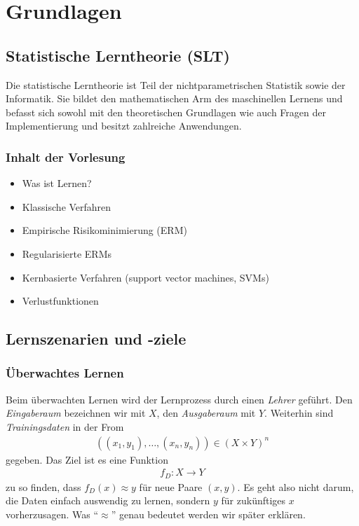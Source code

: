 \chapter{Grundlagen}

\section{Statistische Lerntheorie (SLT)}

Die statistische Lerntheorie ist Teil der nichtparametrischen Statistik sowie
der Informatik. Sie bildet den mathematischen Arm des maschinellen
Lernens und befasst sich sowohl mit den theoretischen Grundlagen wie auch
Fragen der Implementierung und besitzt zahlreiche Anwendungen.

\subsection{Inhalt der Vorlesung}

\begin{itemize}
  \item Was ist Lernen?
  \item Klassische Verfahren
  \item Empirische Risikominimierung (ERM)
  \item Regularisierte ERMs
  \item Kernbasierte Verfahren (support vector machines, SVMs)
  \item Verlustfunktionen
\end{itemize}

\section{Lernszenarien und -ziele}

\subsection{Überwachtes Lernen}
Beim überwachten Lernen wird der Lernprozess durch einen \emph{Lehrer} geführt.
Den \emph{Eingaberaum} bezeichnen wir mit $X$, den \emph{Ausgaberaum} mit $Y$.
Weiterhin sind \emph{Trainingsdaten} in der From
\begin{align*}
((x_1,y_1),\ldots,(x_n,y_n))\in (X\times Y)^n
\end{align*} 
gegeben. Das Ziel ist es eine Funktion
\begin{align*}
f_D : X\to Y
\end{align*}
zu so finden, dass $f_D(x)\approx y$ für neue Paare $(x,y)$. Es geht also
nicht darum, die Daten einfach auswendig zu lernen, sondern $y$ für zukünftiges $x$
vorherzusagen. Was ``$\approx$'' genau bedeutet werden wir später erklären.

